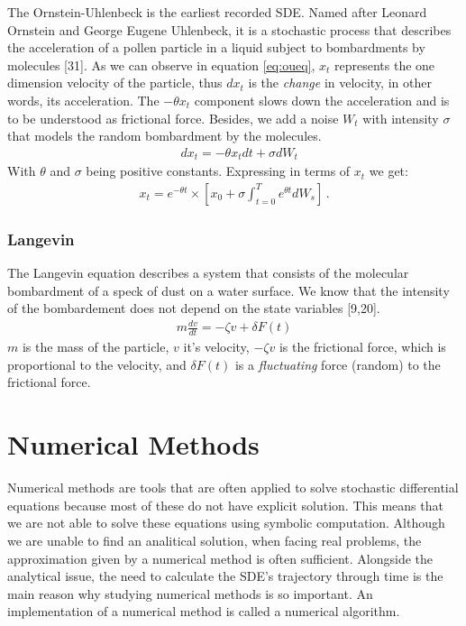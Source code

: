 \documentclass[12pt,twoside]{reedthesis}
\theoremstyle{definition}
\theoremstyle{definition}
\theoremstyle{remark}
\begin{document}
  The Ornstein-Uhlenbeck is the earliest recorded SDE. Named after Leonard
  Ornstein and George Eugene Uhlenbeck, it is a stochastic process that
  describes the acceleration of a pollen particle in a liquid subject to
  bombardments by molecules {[}31{]}. As we can observe in equation
  \eqref{eq:oueq}, \(x_t\) represents the one dimension velocity of the
  particle, thus \(dx_t\) is the \emph{change} in velocity, in other
  words, its acceleration. The \(- \theta x_t\) component slows down the
  acceleration and is to be understood as frictional force. Besides, we
  add a noise \(W_t\) with intensity \(\sigma\) that models the random
  bombardment by the molecules.
  \begin{align} 
  \label{eq:oueq}
  &d x_t = - \theta x_t dt + \sigma d W_t
  \end{align}
  With \(\theta\) and \(\sigma\) being positive constants. Expressing in
  terms of \(x_t\) we get:
  \begin{align}
  x_t = e^{-\theta t} \times \left[ x_0  + \sigma \int_{t=0}^{T} e^{\theta t} d W_s \right] \,.
  \end{align}
  \subsubsection{Langevin}\label{langevin}
  
  The Langevin equation describes a system that consists of the molecular
  bombardment of a speck of dust on a water surface. We know that the
  intensity of the bombardement does not depend on the state variables
  {[}9,20{]}.
  \begin{align}
  m \frac{dv}{dt} = -\zeta v + \delta F (t) 
  \end{align}
  \(m\) is the mass of the particle, \(v\) it's velocity, \(-\zeta v\) is
  the frictional force, which is proportional to the velocity, and
  \(\delta F (t)\) is a \emph{fluctuating} force (random) to the
  frictional force.
  
  \section{Numerical Methods}\label{numerical-methods}
  
  Numerical methods are tools that are often applied to solve stochastic
  differential equations because most of these do not have explicit
  solution. This means that we are not able to solve these equations using
  symbolic computation. Although we are unable to find an analitical
  solution, when facing real problems, the approximation given by a
  numerical method is often sufficient. Alongside the analytical issue,
  the need to calculate the SDE's trajectory through time is the main
  reason why studying numerical methods is so important. An implementation
  of a numerical method is called a numerical algorithm.
  
\end{document}
